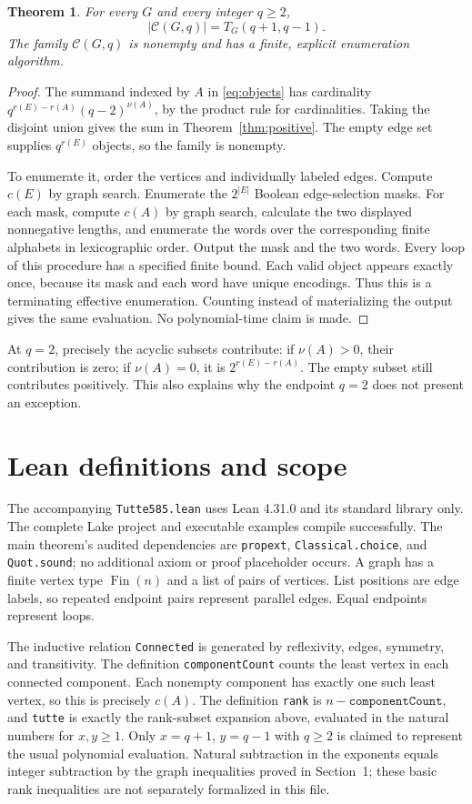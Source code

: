 \documentclass[11pt]{article}
\newtheorem{theorem}{Theorem}
\begin{document}
\begin{theorem}\label{thm:count}
For every $G$ and every integer $q\ge2$,
\[
 |\mathcal C(G,q)|=T_G(q+1,q-1).
\]
The family $\mathcal C(G,q)$ is nonempty and has a finite, explicit
enumeration algorithm.
\end{theorem}
\begin{proof}
The summand indexed by $A$ in \eqref{eq:objects} has cardinality
$q^{r(E)-r(A)}(q-2)^{\nu(A)}$, by the product rule for cardinalities.
Taking the disjoint union gives the sum in Theorem~\ref{thm:positive}.
The empty edge set supplies $q^{r(E)}$ objects, so the family is nonempty.

To enumerate it, order the vertices and individually labeled edges. Compute
$c(E)$ by graph search. Enumerate the $2^{|E|}$ Boolean edge-selection masks.
For each mask, compute $c(A)$ by graph search, calculate the two displayed
nonnegative lengths, and enumerate the words over the corresponding finite
alphabets in lexicographic order. Output the mask and the two words. Every
loop of this procedure has a specified finite bound. Each valid object
appears exactly once, because its mask and each word have unique encodings.
Thus this is a terminating effective enumeration. Counting instead of
materializing the output gives the same evaluation. No polynomial-time
claim is made.
\end{proof}
At $q=2$, precisely the acyclic subsets contribute: if $\nu(A)>0$, their
contribution is zero; if $\nu(A)=0$, it is $2^{r(E)-r(A)}$. The empty
subset still contributes positively. This also explains why the endpoint
$q=2$ does not present an exception.

\section{Lean definitions and scope}
The accompanying \texttt{Tutte585.lean} uses Lean 4.31.0 and its standard
library only. The complete Lake project and executable examples compile
successfully. The main theorem's audited dependencies are \texttt{propext},
\texttt{Classical.choice}, and \texttt{Quot.sound}; no additional axiom
or proof placeholder occurs.
A graph has a finite vertex type $\operatorname{Fin}(n)$ and a list of pairs
of vertices. List positions are edge labels, so repeated endpoint pairs
represent parallel edges. Equal endpoints represent loops.

The inductive relation \texttt{Connected} is generated by reflexivity,
edges, symmetry, and transitivity. The definition \texttt{componentCount}
counts the least vertex in each connected component. Each nonempty component
has exactly one such least vertex, so this is precisely $c(A)$.
The definition \texttt{rank} is $n-\texttt{componentCount}$, and
\texttt{tutte} is exactly the rank-subset expansion above, evaluated in the
natural numbers for $x,y\ge1$. Only $x=q+1$, $y=q-1$ with $q\ge2$ is claimed
to represent the usual polynomial evaluation. Natural subtraction in the
exponents equals integer subtraction by the graph inequalities proved in
Section~1; these basic rank inequalities are not separately formalized in
this file.
\end{document}
